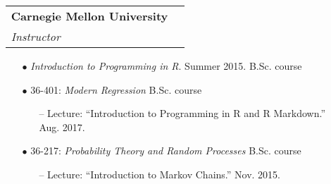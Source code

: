 \documentclass[letterpaper,10pt]{article}
\makeatletter
\newcommand{\subheadingtwolines}[4]{
\begin{tabular*}{6.45in}{l@{\cftdotfill{\cftsecdotsep}\extracolsep{\fill}}r}
#1 & #2 \\
#3 & #4 \\
\end{tabular*}}
\makeatother
\begin{document}
\begin{itemize}[leftmargin=0.4cm]
\item[] \hspace{-2ex}\subheadingtwolines{\bf Carnegie Mellon University}{}{\it Instructor}{}
\vspace{-0.1cm}
\begin{itemize}[leftmargin=0.4cm, rightmargin=0.3cm]
\item[$\bullet$] {\it Introduction to Programming in R}. Summer 2015. \hfill B.Sc. course
\end{itemize}


\vspace{0.05cm}
\item[] \hspace{-1.5ex}{\it Guest Lecturer} 
\vspace{-0.075cm}
\begin{itemize}[leftmargin=0.4cm, rightmargin=0.3cm]
\item[$\bullet$] 36-401: \emph{Modern Regression} \hfill B.Sc. course
\begin{itemize}
\item[--] Lecture: ``Introduction to Programming in R and R Markdown.'' Aug. 2017.
\end{itemize}
\item[$\bullet$]36-217: \emph{Probability Theory and Random Processes} \hfill B.Sc. course
\begin{itemize}
\item[--] Lecture: ``Introduction to Markov Chains.'' Nov. 2015.
\end{itemize}
\end{itemize}



\end{itemize}
\end{document}
